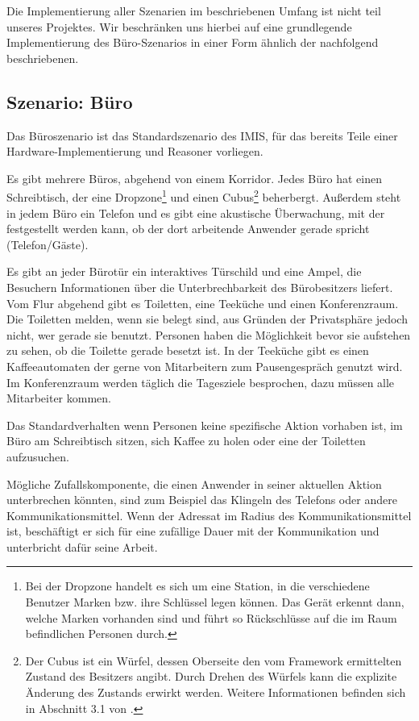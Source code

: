 Die Implementierung aller Szenarien im beschriebenen Umfang ist nicht teil unseres Projektes. Wir beschränken uns hierbei auf eine grundlegende Implementierung des Büro-Szenarios in einer Form ähnlich der nachfolgend beschriebenen. 

\subsection*{Szenario: Büro}

Das Büroszenario ist das Standardszenario des IMIS, für das bereits Teile einer Hardware-Implemen\-tierung und Reasoner vorliegen.

Es gibt mehrere Büros, abgehend von einem Korridor. Jedes Büro hat einen Schreibtisch, der eine Dropzone\footnote{Bei der Dropzone handelt es sich um eine Station, in die verschiedene Benutzer Marken bzw. ihre Schlüssel legen können. Das Gerät erkennt dann, welche Marken vorhanden sind und führt so Rückschlüsse auf die im Raum befindlichen Personen durch.} und einen Cubus\footnote{Der Cubus ist ein Würfel, dessen Oberseite den vom Framework ermittelten Zustand des Besitzers angibt. Durch Drehen des Würfels kann die explizite Änderung des Zustands erwirkt werden. Weitere Informationen befinden sich in Abschnitt 3.1 von \cite{doku-sensor-aktuator}.} beherbergt. Außerdem steht in jedem Büro ein Telefon und es gibt eine akustische Überwachung, mit der festgestellt werden kann, ob der dort arbeitende Anwender gerade spricht (Telefon/Gäste). 

Es gibt an jeder Bürotür ein interaktives Türschild und eine Ampel, die Besuchern Informationen über die Unterbrechbarkeit des Bürobesitzers liefert.
Vom Flur abgehend gibt es Toiletten, eine Teeküche und einen Konferenzraum. Die Toiletten melden, wenn sie belegt sind, aus Gründen der Privatsphäre jedoch nicht, wer gerade sie benutzt. Personen haben die Möglichkeit bevor sie aufstehen zu sehen, ob die Toilette gerade besetzt ist. In der Teeküche gibt es einen Kaffeeautomaten der gerne von Mitarbeitern zum Pausengespräch genutzt wird. Im Konferenzraum werden täglich die Tagesziele besprochen, dazu müssen alle Mitarbeiter kommen.

Das Standardverhalten wenn Personen keine spezifische Aktion vorhaben ist, im Büro am Schreibtisch sitzen, sich Kaffee zu holen oder eine der Toiletten aufzusuchen.

Mögliche Zufallskomponente, die einen Anwender in seiner aktuellen Aktion unterbrechen könnten, sind zum Beispiel das Klingeln des Telefons oder andere Kommunikationsmittel. Wenn der Adressat im Radius des Kommunikationsmittel ist, beschäftigt er sich für eine zufällige Dauer mit der Kommunikation und unterbricht dafür seine Arbeit.

